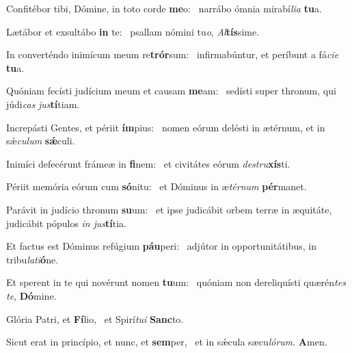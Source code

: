 \item Confitébor tibi, Dómine, in toto corde \textbf{me}o:~\psstar{} narrábo ómnia mirabí\textit{lia} \textbf{tu}a.
\item Lætábor et exsultábo \textbf{in} te:~\psstar{} psallam nómini tu\textit{o}, \textit{Al}\textbf{tís}sime.
\item In converténdo inimícum meum re\textbf{trór}sum:~\psstar{} infirmabúntur, et períbunt a fá\textit{cie} \textbf{tu}a.
\item Quóniam fecísti judícium meum et causam \textbf{me}am:~\psstar{} sedísti super thronum, qui júdi\textit{cas} \textit{jus}\textbf{tí}tiam.
\item Increpásti Gentes, et périit \textbf{ím}pius:~\psstar{} nomen eórum delésti in ætérnum, et in sǽ\textit{culum} \textbf{sǽ}culi.
\item Inimíci defecérunt frámeæ in \textbf{fi}nem:~\psstar{} et civitátes eórum \textit{destru}\textbf{xís}ti.
\item Périit memória eórum cum \textbf{só}nitu:~\psstar{} et Dóminus in æ\textit{térnum} \textbf{pér}manet.
\item Parávit in judício thronum \textbf{su}um:~\psstar{} et ipse judicábit orbem terræ in æquitáte, judicábit pópulos \textit{in} \textit{jus}\textbf{tí}tia.
\item Et factus est Dóminus refúgium \textbf{páu}peri:~\psstar{} adjútor in opportunitátibus, in tribu\textit{lati}\textbf{ó}ne.
\item Et sperent in te qui novérunt nomen \textbf{tu}um:~\psstar{} quóniam non dereliquísti quærén\textit{tes} \textit{te}, \textbf{Dó}mine.
\item Glória Patri, et \textbf{Fí}lio,~\psstar{} et Spirí\textit{tui} \textbf{Sanc}to.
\item Sicut erat in princípio, et nunc, et \textbf{sem}per,~\psstar{} et in sǽcula sæcu\textit{lórum}. \textbf{A}men.
